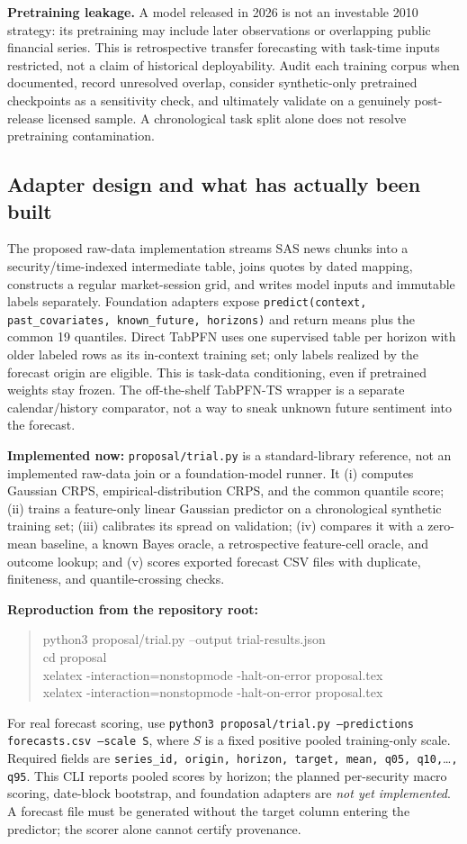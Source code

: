 \documentclass[11pt,letterpaper]{article}
\begin{document}
\textbf{Pretraining leakage.} A model released in 2026 is not an investable 2010 strategy: its pretraining may include later observations or overlapping public financial series. This is retrospective transfer forecasting with task-time inputs restricted, not a claim of historical deployability. Audit each training corpus when documented, record unresolved overlap, consider synthetic-only pretrained checkpoints as a sensitivity check, and ultimately validate on a genuinely post-release licensed sample. A chronological task split alone does not resolve pretraining contamination.

\subsection{Adapter design and what has actually been built}
The proposed raw-data implementation streams SAS news chunks into a security/time-indexed intermediate table, joins quotes by dated mapping, constructs a regular market-session grid, and writes model inputs and immutable labels separately. Foundation adapters expose
\texttt{predict(context, past\_covariates, known\_future, horizons)}
and return means plus the common 19 quantiles. Direct TabPFN uses one supervised table per horizon with older labeled rows as its in-context training set; only labels realized by the forecast origin are eligible. This is task-data conditioning, even if pretrained weights stay frozen. The off-the-shelf TabPFN-TS wrapper is a separate calendar/history comparator, not a way to sneak unknown future sentiment into the forecast.

\textbf{Implemented now:} \texttt{proposal/trial.py} is a standard-library reference, not an implemented raw-data join or a foundation-model runner. It (i) computes Gaussian CRPS, empirical-distribution CRPS, and the common quantile score; (ii) trains a feature-only linear Gaussian predictor on a chronological synthetic training set; (iii) calibrates its spread on validation; (iv) compares it with a zero-mean baseline, a known Bayes oracle, a retrospective feature-cell oracle, and outcome lookup; and (v) scores exported forecast CSV files with duplicate, finiteness, and quantile-crossing checks.

\textbf{Reproduction from the repository root:}
\begin{quote}\small\ttfamily
python3 proposal/trial.py --output trial-results.json\\
cd proposal\\
xelatex -interaction=nonstopmode -halt-on-error proposal.tex\\
xelatex -interaction=nonstopmode -halt-on-error proposal.tex
\end{quote}
For real forecast scoring, use
\texttt{python3 proposal/trial.py --predictions forecasts.csv --scale S},
where $S$ is a fixed positive pooled training-only scale. Required fields are
\texttt{series\_id, origin, horizon, target, mean, q05, q10,}\ldots\texttt{, q95}.
This CLI reports pooled scores by horizon; the planned per-security macro scoring, date-block bootstrap, and foundation adapters are \emph{not yet implemented}. A forecast file must be generated without the target column entering the predictor; the scorer alone cannot certify provenance.
\end{document}
